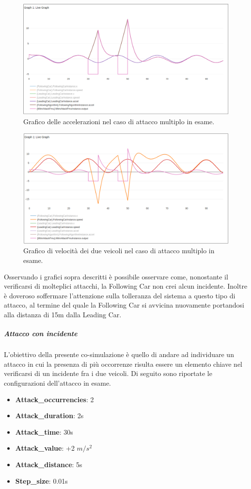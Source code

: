 \begin{figure}[H]
	\centering
	\includegraphics[width=\textwidth]{img/MultiAttackAccelPlotAccelNoCrash.png}
	\caption{Grafico delle accelerazioni nel caso di attacco multiplo in esame.}
\end{figure}
\begin{figure}[H]
	\centering
	\includegraphics[width=\textwidth]{img/MultiAttackAccelPlotSpeedNoCrash.png}
	\caption{Grafico di velocità dei due veicoli nel caso di attacco multiplo in esame.}
\end{figure}

Osservando i grafici sopra descritti è possibile osservare come, nonostante il verificarsi di molteplici attacchi, la Following Car non crei alcun incidente. Inoltre è doveroso soffermare l'attenzione sulla tolleranza del sistema a questo tipo di attacco, al termine del quale la Following Car si avvicina nuovamente portandosi alla distanza di 15m dalla Leading Car.

\subparagraph{Attacco con incidente}
L'obiettivo della presente co-simulazione è quello di andare ad individuare un attacco in cui la presenza di più occorrenze risulta essere un elemento chiave nel verificarsi di un incidente fra i due veicoli. Di seguito sono riportate le configurazioni dell'attacco in esame.
\begin{itemize}
\item \textbf{Attack\_occurrencies}: 2
\item \textbf{Attack\_duration}: 2s
\item \textbf{Attack\_time}: 30s
\item \textbf{Attack\_value}: +2 $m/s^2$
\item \textbf{Attack\_distance}: 5s
\item \textbf{Step\_size}: 0.01s
\end{itemize}

